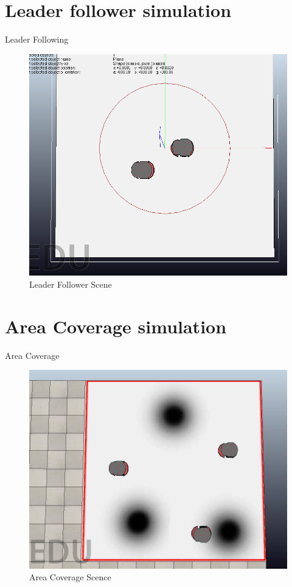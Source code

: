\documentclass{beamer}
\begin{document}
\section{Leader follower simulation}
\begin{frame}{Leader Following}
\begin{center}
\begin{figure}
\includegraphics[scale=0.25]{figs/img/leader.png}
\caption{Leader Follower Scene}
\end{figure}
\end{center}

\end{frame}
\section{Area Coverage simulation}
\begin{frame}{Area Coverage}
\begin{center}
\begin{figure}
\includegraphics[scale=0.25]{figs/img/area.png}
\caption{Area Coverage Scence}
\end{figure}
\end{center}
\end{frame}
\end{document}
